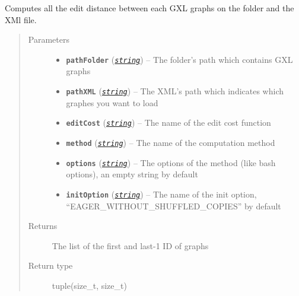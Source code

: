 \documentclass[letterpaper,10pt,english]{sphinxmanual}
\begin{document}

\begin{fulllineitems}
\label{doc:PythonGedLib.computeEditDistanceOnGXlGraphs}
Computes all the edit distance between each GXL graphs on the folder and the XMl file.
\begin{quote}\begin{description}
\item[{Parameters}] \leavevmode\begin{itemize}
\item {} 
\textbf{\texttt{pathFolder}} (\href{https://docs.python.org/3/library/string.html\#module-string}{\emph{\texttt{string}}}) -- The folder's path which contains GXL graphs

\item {} 
\textbf{\texttt{pathXML}} (\href{https://docs.python.org/3/library/string.html\#module-string}{\emph{\texttt{string}}}) -- The XML's path which indicates which graphes you want to load

\item {} 
\textbf{\texttt{editCost}} (\href{https://docs.python.org/3/library/string.html\#module-string}{\emph{\texttt{string}}}) -- The name of the edit cost function

\item {} 
\textbf{\texttt{method}} (\href{https://docs.python.org/3/library/string.html\#module-string}{\emph{\texttt{string}}}) -- The name of the computation method

\item {} 
\textbf{\texttt{options}} (\href{https://docs.python.org/3/library/string.html\#module-string}{\emph{\texttt{string}}}) -- The options of the method (like bash options), an empty string by default

\item {} 
\textbf{\texttt{initOption}} (\href{https://docs.python.org/3/library/string.html\#module-string}{\emph{\texttt{string}}}) -- The name of the init option, ``EAGER\_WITHOUT\_SHUFFLED\_COPIES'' by default

\end{itemize}

\item[{Returns}] \leavevmode
The list of the first and last-1 ID of graphs

\item[{Return type}] \leavevmode
tuple(size\_t, size\_t)


\end{description}
\end{quote}
\end{fulllineitems}
\end{document}
